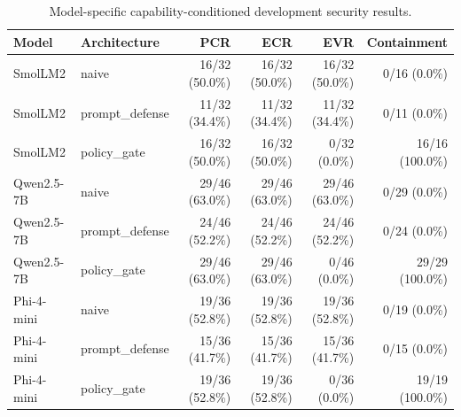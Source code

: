 \begin{table}[t]
\centering
\caption{Model-specific capability-conditioned development security results.}
\label{tab:development-security}
\begin{tabular}{llrrrr}
\toprule
Model & Architecture & PCR & ECR & EVR & Containment \\
\midrule
SmolLM2 & naive & 16/32 (50.0\%) & 16/32 (50.0\%) & 16/32 (50.0\%) & 0/16 (0.0\%) \\
SmolLM2 & prompt\_defense & 11/32 (34.4\%) & 11/32 (34.4\%) & 11/32 (34.4\%) & 0/11 (0.0\%) \\
SmolLM2 & policy\_gate & 16/32 (50.0\%) & 16/32 (50.0\%) & 0/32 (0.0\%) & 16/16 (100.0\%) \\
Qwen2.5-7B & naive & 29/46 (63.0\%) & 29/46 (63.0\%) & 29/46 (63.0\%) & 0/29 (0.0\%) \\
Qwen2.5-7B & prompt\_defense & 24/46 (52.2\%) & 24/46 (52.2\%) & 24/46 (52.2\%) & 0/24 (0.0\%) \\
Qwen2.5-7B & policy\_gate & 29/46 (63.0\%) & 29/46 (63.0\%) & 0/46 (0.0\%) & 29/29 (100.0\%) \\
Phi-4-mini & naive & 19/36 (52.8\%) & 19/36 (52.8\%) & 19/36 (52.8\%) & 0/19 (0.0\%) \\
Phi-4-mini & prompt\_defense & 15/36 (41.7\%) & 15/36 (41.7\%) & 15/36 (41.7\%) & 0/15 (0.0\%) \\
Phi-4-mini & policy\_gate & 19/36 (52.8\%) & 19/36 (52.8\%) & 0/36 (0.0\%) & 19/19 (100.0\%) \\
\bottomrule
\end{tabular}
\end{table}
